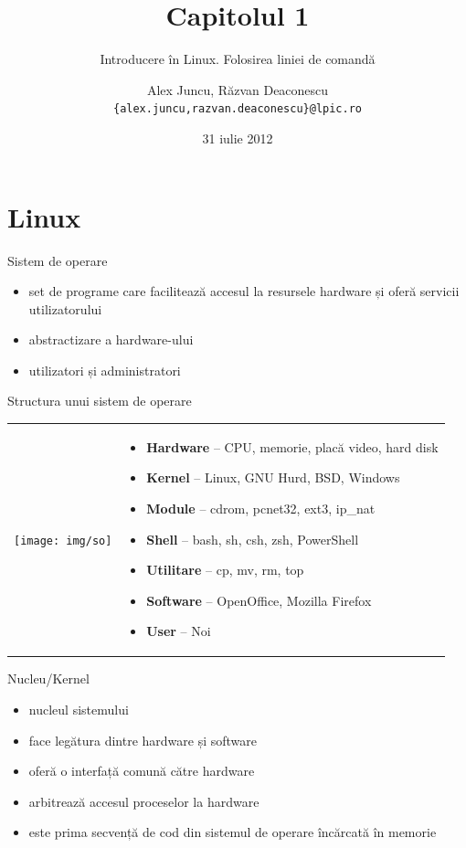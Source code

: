 \documentclass{curs}
\title[Capitolul 1]{Capitolul 1}
\subtitle{Introducere în Linux. Folosirea liniei de comandă}
\author{Alex Juncu, Răzvan Deaconescu \\
  \texttt{\{alex.juncu,razvan.deaconescu\}@lpic.ro}}
\date{31 iulie 2012}
\begin{document}
\frame{\titlepage}


\section{Linux}

\begin{frame}{Sistem de operare}
  \begin{itemize}
    \item set de programe care facilitează accesul la resursele hardware și
      oferă servicii utilizatorului
    \item abstractizare a hardware-ului
    \item utilizatori și administratori
  \end{itemize}
\end{frame}

\begin{frame}{Structura unui sistem de operare}
  \begin{tabular}{m{}m{}}
    \texttt{[image: img/so]}
    &
    \begin{itemize}
      \item \textbf{Hardware} -- CPU, memorie, placă video, hard disk
      \item \textbf{Kernel} -- Linux, GNU Hurd, BSD, Windows
      \item \textbf{Module} -- cdrom, pcnet32, ext3, ip\_nat
      \item \textbf{Shell} -- bash, sh, csh, zsh, PowerShell
      \item \textbf{Utilitare} -- cp, mv, rm, top
      \item \textbf{Software} -- OpenOffice, Mozilla Firefox
      \item \textbf{User} -- Noi
    \end{itemize}
  \end{tabular}
\end{frame}

\begin{frame}{Nucleu/Kernel}
  \begin{itemize}
    \item<1-> nucleul sistemului
    \item<2-> face legătura dintre hardware și software
    \item<3-> oferă o interfață comună către hardware
    \item<4-> arbitrează accesul proceselor la hardware
    \item<5-> este prima secvență de cod din sistemul de operare încărcată în
      memorie
  \end{itemize}
\end{frame}
\end{document}
